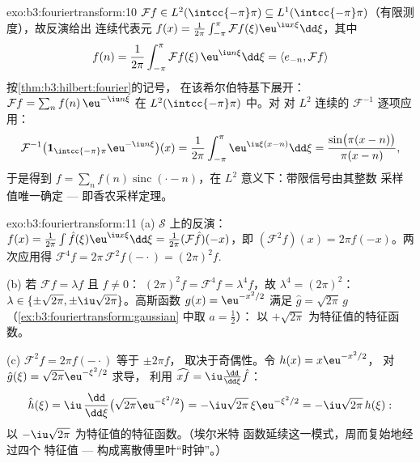 \begin{solution}{exo:b3:fouriertransform:10}
$\mathcal Ff \in L^2(\intcc{-\pi}\pi) \subseteq
L^1(\intcc{-\pi}\pi)$（有限测度），故反演给出
连续代表元 $f(x) =
\frac1{2\pi}\int_{-\pi}^\pi\mathcal Ff(\xi)\eu^{\iu
x\xi}\dd\xi$，其中
\[
f(n) = \frac1{2\pi}\int_{-\pi}^{\pi}\mathcal
Ff(\xi)\,\eu^{\iu n\xi}\dd\xi = \langle e_{-n}, \mathcal
Ff\rangle
\]
按\cref{thm:b3:hilbert:fourier}的记号，
在该希尔伯特基下展开：$\mathcal Ff = \sum_nf(n)\,\eu^{-\iu
n\xi}$ 在 $L^2(\intcc{-\pi}\pi)$ 中。对
对 $L^2$ 连续的 $\mathcal F^{-1}$ 逐项应用：
\[
\mathcal F^{-1}\bigl(\mathbf
1_{\intcc{-\pi}\pi}\eu^{-\iu n\xi}\bigr)(x)
= \frac1{2\pi}\int_{-\pi}^{\pi}\eu^{\iu\xi(x - n)}\dd\xi
= \frac{\sin\bigl(\pi(x-n)\bigr)}{\pi(x - n)} ,
\]
于是得到 $f = \sum_nf(n)\operatorname{sinc}(\cdot - n)$，在
$L^2$ 意义下：带限信号由其整数
采样值唯一确定 --- 即香农采样定理。
\end{solution}

\begin{solution}{exo:b3:fouriertransform:11}
(a) $\mathcal S$ 上的反演：$f(x) =
\frac1{2\pi}\int\hat f(\xi)\eu^{\iu x\xi}\dd\xi =
\frac1{2\pi}(\mathcal F\hat f)(-x)$，即 $(\mathcal
F^2f)(x) = 2\pi f(-x)$。两次应用得 $\mathcal F^4f =
2\pi\,\mathcal F^2f(-\cdot) = (2\pi)^2f$.

(b) 若 $\mathcal Ff = \lambda f$ 且 $f \neq 0$：
$(2\pi)^2f = \mathcal F^4f = \lambda^4f$，故 $\lambda^4 =
(2\pi)^2$：$\lambda \in \{\pm\sqrt{2\pi},
\pm\iu\sqrt{2\pi}\}$。高斯函数 $g(x) = \eu^{-x^2/2}$ 满足
$\hat g = \sqrt{2\pi}\,g$
（\cref{ex:b3:fouriertransform:gaussian} 中取 $a = \frac12$）：
以 $+\sqrt{2\pi}$ 为特征值的特征函数。

(c) $\mathcal F^2f = 2\pi f(-\cdot)$ 等于 $\pm2\pi f$，
取决于奇偶性。令 $h(x) = x\eu^{-x^2/2}$，
对 $\hat g(\xi) = \sqrt{2\pi}\eu^{-\xi^2/2}$ 求导，
利用 $\widehat{xf} = \iu\frac{\dd}{\dd\xi}\hat f$：
\[
\hat h(\xi) = \iu\,\frac{\dd}{\dd\xi}\bigl(\sqrt{2\pi}
\eu^{-\xi^2/2}\bigr) = -\iu\sqrt{2\pi}\,\xi\eu^{-\xi^2/2}
= -\iu\sqrt{2\pi}\,h(\xi) :
\]
以 $-\iu\sqrt{2\pi}$ 为特征值的特征函数。（埃尔米特
函数延续这一模式，周而复始地经过四个
特征值 --- 构成离散傅里叶“时钟”。）

\end{solution}

